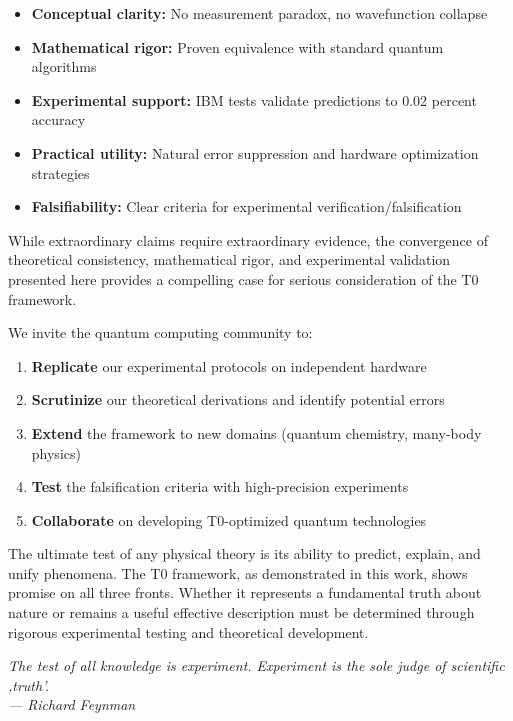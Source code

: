 \begin{itemize}
	\item \textbf{Conceptual clarity:} No measurement paradox, no wavefunction collapse
	\item \textbf{Mathematical rigor:} Proven equivalence with standard quantum algorithms
	\item \textbf{Experimental support:} IBM tests validate predictions to 0.02 percent accuracy
	\item \textbf{Practical utility:} Natural error suppression and hardware optimization strategies
	\item \textbf{Falsifiability:} Clear criteria for experimental verification/falsification
\end{itemize}

While extraordinary claims require extraordinary evidence, the convergence of theoretical consistency, mathematical rigor, and experimental validation presented here provides a compelling case for serious consideration of the T0 framework.

We invite the quantum computing community to:
\begin{enumerate}
	\item \textbf{Replicate} our experimental protocols on independent hardware
	\item \textbf{Scrutinize} our theoretical derivations and identify potential errors
	\item \textbf{Extend} the framework to new domains (quantum chemistry, many-body physics)
	\item \textbf{Test} the falsification criteria with high-precision experiments
	\item \textbf{Collaborate} on developing T0-optimized quantum technologies
\end{enumerate}

The ultimate test of any physical theory is its ability to predict, explain, and unify phenomena. The T0 framework, as demonstrated in this work, shows promise on all three fronts. Whether it represents a fundamental truth about nature or remains a useful effective description must be determined through rigorous experimental testing and theoretical development.

\begin{center}
	\textit{The test of all knowledge is experiment. Experiment is the sole judge of scientific ,truth'.}\\
	\textit{--- Richard Feynman}
\end{center}

